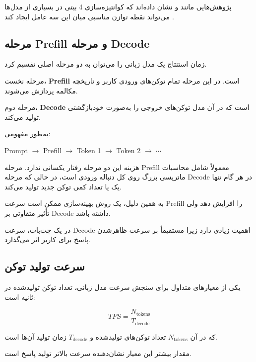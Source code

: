 پژوهش‌هایی مانند  و  نشان داده‌اند که کوانتیزه‌سازی
4 بیتی در بسیاری از مدل‌ها می‌تواند نقطه توازن مناسبی میان
این سه عامل ایجاد کند
\cite{frantar2022gptq,lin2023awq}.


\subsection{مرحله Prefill و مرحله Decode}

زمان استنتاج یک مدل زبانی را می‌توان به دو مرحله اصلی تقسیم
کرد.

مرحله نخست،
\textbf{Prefill}
است.
در این مرحله تمام توکن‌های ورودی کاربر و تاریخچه مکالمه
پردازش می‌شوند.

مرحله دوم،
\textbf{Decode}
است که در آن مدل توکن‌های خروجی را به‌صورت خودبازگشتی
تولید می‌کند.

به‌طور مفهومی:

\begin{center}
Prompt
$\longrightarrow$
Prefill
$\longrightarrow$
Token 1
$\longrightarrow$
Token 2
$\longrightarrow$
$\cdots$
\end{center}

هزینه این دو مرحله رفتار یکسانی ندارد.
مرحله Prefill معمولاً شامل محاسبات ماتریسی بزرگ روی کل
دنباله ورودی است، در حالی که مرحله Decode در هر گام تنها
یک یا تعداد کمی توکن جدید تولید می‌کند.

به همین دلیل، یک روش بهینه‌سازی ممکن است سرعت Prefill را
افزایش دهد ولی تأثیر متفاوتی بر Decode داشته باشد.

در یک چت‌بات، سرعت Decode اهمیت زیادی دارد زیرا مستقیماً
بر سرعت ظاهرشدن پاسخ برای کاربر اثر می‌گذارد.


\subsection{سرعت تولید توکن}

یکی از معیارهای متداول برای سنجش سرعت مدل زبانی،
تعداد توکن تولیدشده در ثانیه است:

\begin{equation}
TPS
=
\frac{N_{\mathrm{tokens}}}
     {T_{\mathrm{decode}}}
\end{equation}

که در آن $N_{\mathrm{tokens}}$ تعداد توکن‌های تولیدشده
و $T_{\mathrm{decode}}$ زمان تولید آن‌ها است.

مقدار بیشتر این معیار نشان‌دهنده سرعت بالاتر تولید پاسخ است.

